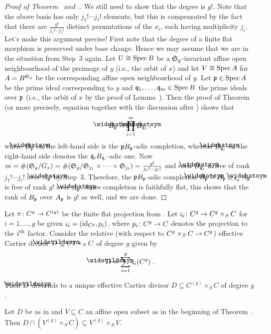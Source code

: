 \documentclass[a4paper,parskip=half,numbers=enddot, DIV=12]{scrreprt}
\begin{document}
\begin{proof}[Proof of Theorem~ and .]
	We still need to show that the degree is $g!$. Note that the above basis has only $j_1!\cdots j_\ell!$ elements, but this is compensated by the fact that there are $\frac{g!}{j_1!\cdots j_\ell!}$ distinct permutations of the $x_i$, each having multiplicity $j_i$. Let's make this argument precise! First note that the degree of a finite flat morphism is preserved under base change. Hence we may assume that we are in the situation from Step~3 again. Let $U\cong \operatorname{Spec} B$ be a $\mathfrak{S}_g$-invariant affine open neighbourhood of the preimage of $y$ (i.e., the orbit of $x$) and let $V\cong \operatorname{Spec} A$ for $A=B^{\mathfrak{S}_g}$ be the corresponding affine open neighbourhood of $y$. Let $\mathfrak{p}\in \operatorname{Spec} A$ be the prime ideal corresponding to $y$ and $\mathfrak{q}_1,\ldots,\mathfrak{q}_m\in\operatorname{Spec} B$ the prime ideals over $\mathfrak{p}$ (i.e., the orbit of $x$ by the proof of Lemma~). Then the proof of Theorem~ (or more precisely, equation  together with the discussion after ) shows that
	\begin{align}\lbl{eq:BpBqi}
		\roof{B}_\pp\cong \prod_{i=1}^m\roof{B}_{\qq_i}\;,
	\end{align}
	where $\roof{B}_\pp$ on the left-hand side is the $\mathfrak{p} B_{\mathfrak{p}}$-adic completion, whereas $\roof{B}_{\qq_i}$ on the right-hand side denotes the $\mathfrak{q}_iB_{\mathfrak{q}_i}$-adic one. Now $m=\#(\mathfrak{S}_g/G_x)=\#(\mathfrak{S}_g/\mathfrak{S}_{j_1}\times\cdots\times\mathfrak{S}_{j_\ell})=\frac{g!}{j_1!\cdots j_\ell!}$ and each $\roof{B}_{\qq_i}$ is free of rank $j_1!\cdots j_\ell!$ over $\roof{A}_\pp$ by Step~3. Therefore, the $\mathfrak{p} B_{\mathfrak{p}}$-adic completion $\roof{B}_\pp\cong B_\pp\otimes_{A_\pp}\roof{A}_\pp$ is free of rank $g!$ over $\roof{A}_\pp$. Since completion is faithfully flat, this shows that the rank of $B_{\mathfrak{p}}$ over $A_{\mathfrak{p}}$ is $g!$ as well, and we are done.
\end{proof}
\setcounter{thm}{11}
\begin{thm}[continuation]
	Let $\pi\colon C^g\morphism C^{(g)}$ be the finite flat projection from . Let $\varsigma_i\colon C^g\morphism C^g\times_SC$ for $i=1,\ldots,g$ be given $\varsigma_i=(\operatorname{id}_{C^g},p_i)$, where $p_i\colon C^g\morphism C$ denotes the projection to the $i^{\text{th}}$ factor. Consider the relative (with respect to $C^g\times_SC\morphism C^g$) effective Cartier divisor $\snake{D}\subseteq C^g\times_SC$ of degree $g$ given by
	\begin{align*}
		\snake{D}=\sum_{i=1}^g\varsigma_i(C^g)\;.
	\end{align*}
	\begin{alphanumerate}\setcounter{enumi}{2}
		\item Then $\snake{D}$ descends to a unique effective Cartier divisor $D\subseteq C^{(g)}\times_SC$ of degree $g$.
		\item Let $D$ be as in  and $V\subseteq C$ an affine open subset as in the beginning of Theorem~. Then $D\cap (V^{(g)}\times_SC)\subseteq V^{(g)}\times_SV$.
	\end{alphanumerate}
\end{thm}
\end{document}
